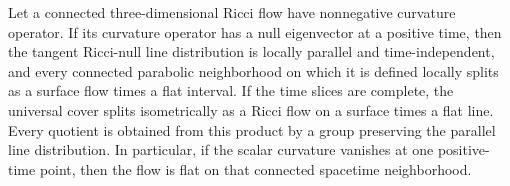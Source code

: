 \begin{theorem}
\label{thm:curvature-null-splitting}
\notready
Let a connected three-dimensional Ricci flow have nonnegative curvature
operator.  If its curvature operator has a null eigenvector at a positive
time, then the tangent Ricci-null line distribution is locally parallel and time-independent,
and every connected parabolic neighborhood on which it is defined locally
splits as a surface flow times a flat interval.  If the time slices are
complete, the universal cover splits isometrically as a Ricci flow on a
surface times a flat line.  Every quotient is obtained from this product by
a group preserving the parallel line distribution.  In
particular, if the scalar curvature vanishes at one positive-time point,
then the flow is flat on that connected spacetime neighborhood.
\end{theorem}

